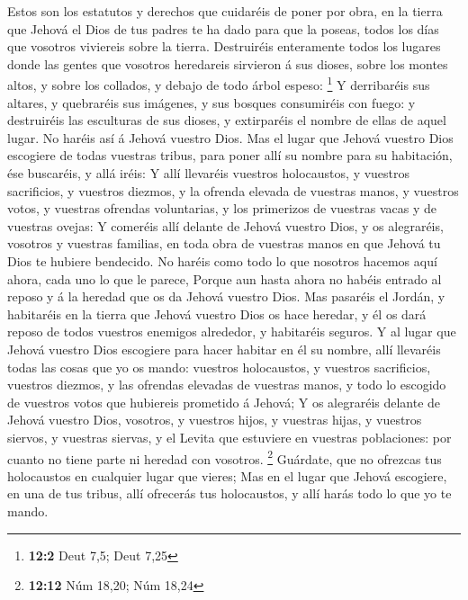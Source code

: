  Estos son los estatutos y derechos que cuidaréis de poner
por obra, en la tierra que Jehová el Dios de tus padres te ha dado para
que la poseas, todos los días que vosotros viviereis sobre la tierra.
 Destruiréis enteramente todos los lugares donde las gentes
que vosotros heredareis sirvieron á sus dioses, sobre los montes altos,
y sobre los collados, y debajo de todo árbol espeso: \footnote{\textbf{12:2}
  Deut 7,5; Deut 7,25}  Y derribaréis sus altares, y
quebraréis sus imágenes, y sus bosques consumiréis con fuego: y
destruiréis las esculturas de sus dioses, y extirparéis el nombre de
ellas de aquel lugar.  No haréis así á Jehová vuestro Dios.
 Mas el lugar que Jehová vuestro Dios escogiere de todas
vuestras tribus, para poner allí su nombre para su habitación, ése
buscaréis, y allá iréis:  Y allí llevaréis vuestros
holocaustos, y vuestros sacrificios, y vuestros diezmos, y la ofrenda
elevada de vuestras manos, y vuestros votos, y vuestras ofrendas
voluntarias, y los primerizos de vuestras vacas y de vuestras ovejas:
 Y comeréis allí delante de Jehová vuestro Dios, y os
alegraréis, vosotros y vuestras familias, en toda obra de vuestras manos
en que Jehová tu Dios te hubiere bendecido.  No haréis como
todo lo que nosotros hacemos aquí ahora, cada uno lo que le parece,
 Porque aun hasta ahora no habéis entrado al reposo y á la
heredad que os da Jehová vuestro Dios.  Mas pasaréis el
Jordán, y habitaréis en la tierra que Jehová vuestro Dios os hace
heredar, y él os dará reposo de todos vuestros enemigos alrededor, y
habitaréis seguros.  Y al lugar que Jehová vuestro Dios
escogiere para hacer habitar en él su nombre, allí llevaréis todas las
cosas que yo os mando: vuestros holocaustos, y vuestros sacrificios,
vuestros diezmos, y las ofrendas elevadas de vuestras manos, y todo lo
escogido de vuestros votos que hubiereis prometido á Jehová;
 Y os alegraréis delante de Jehová vuestro Dios, vosotros,
y vuestros hijos, y vuestras hijas, y vuestros siervos, y vuestras
siervas, y el Levita que estuviere en vuestras poblaciones: por cuanto
no tiene parte ni heredad con vosotros. \footnote{\textbf{12:12} Núm
  18,20; Núm 18,24}  Guárdate, que no ofrezcas tus
holocaustos en cualquier lugar que vieres;  Mas en el lugar
que Jehová escogiere, en una de tus tribus, allí ofrecerás tus
holocaustos, y allí harás todo lo que yo te mando.

